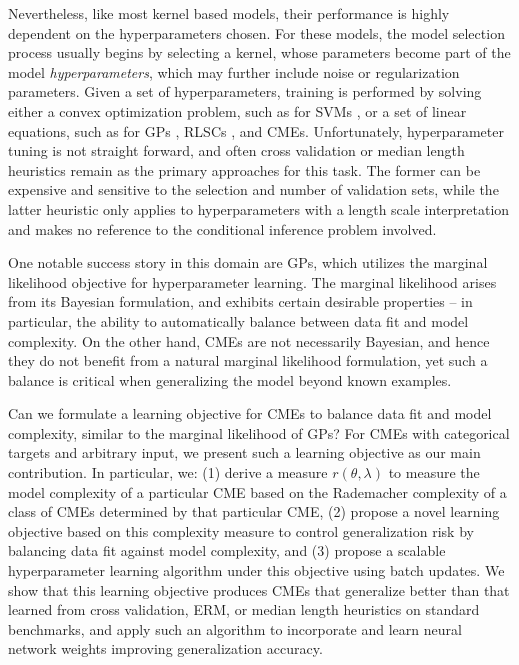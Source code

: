 \documentclass{llncs}
\begin{document}
	Nevertheless, like most kernel based models, their performance is highly dependent on the hyperparameters chosen. For these models, the model selection process usually begins by selecting a kernel, whose parameters become part of the model \textit{hyperparameters}, which may further include noise or regularization parameters. Given a set of hyperparameters, training is performed by solving either a convex optimization problem, such as for \glspl{SVM} \citep{scholkopf2002learning}, or a set of linear equations, such as for \gls{GPs} \citep{rasmussen2006gaussian}, \glspl{RLSC} \citep{rifkin2003regularized}, and \glspl{CME}. Unfortunately, hyperparameter tuning is not straight forward, and often cross validation \citep{song2013kernel} or median length heuristics \citep{muandet2016kernel} remain as the primary approaches for this task. The former can be expensive and sensitive to the selection and number of validation sets, while the latter heuristic only applies to hyperparameters with a length scale interpretation and makes no reference to the conditional inference problem involved.
	
	
	One notable success story in this domain are \gls{GPs}, which utilizes the marginal likelihood objective for hyperparameter learning. The marginal likelihood arises from its Bayesian formulation, and exhibits certain desirable properties -- in particular, the ability to automatically balance between data fit and model complexity. On the other hand, \glspl{CME} are not necessarily Bayesian, and hence they do not benefit from a natural marginal likelihood formulation, yet such a balance is critical when generalizing the model beyond known examples.
	
	
	Can we formulate a learning objective for \glspl{CME} to balance data fit and model complexity, similar to the marginal likelihood of \gls{GPs}? For \glspl{CME} with categorical targets and arbitrary input, we present such a learning objective as our main contribution. In particular, we: (1) derive a measure $r(\theta, \lambda)$ to measure the model complexity of a particular \gls{CME} based on the Rademacher complexity of a class of \glspl{CME} determined by that particular \gls{CME}, (2) propose a novel learning objective based on this complexity measure to control generalization risk by balancing data fit against model complexity, and (3) propose a scalable hyperparameter learning algorithm under this objective using batch updates. We show that this learning objective produces \glspl{CME} that generalize better than that learned from cross validation, \gls{ERM}, or median length heuristics on standard benchmarks, and apply such an algorithm to incorporate and learn neural network weights improving generalization accuracy. %
	
\end{document}
